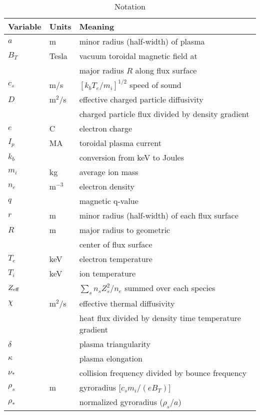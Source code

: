 \begin{table}
\caption{Notation}


\label{table-notation}
\begin{center}
\begin{tabular}{lll}
\hline \hline
Variable \hspace{3pt} & Units \hspace{3pt} & Meaning \\
\hline %
$a$& m & minor radius (half-width) of plasma \\
$B_T$ & Tesla & vacuum toroidal magnetic field at \\ &
   & major radius $R$ along flux surface \\
$c_s$ & m/s & $ [k_b T_e / m_i]^{1/2} $ speed of sound \\
$D$ & m$^2$/s & effective charged particle diffusivity \\
 & & charged particle flux divided by density gradient \\
$e$ & C & electron charge \\
$I_p$ & MA & toroidal plasma current \\
$k_b$ &  & conversion from keV to Joules \\
$m_i$ & kg  & average ion mass \\
$n_e$ & m$^{-3}$ & electron density \\
$q$  & & magnetic q-value \\
$r$& m & minor radius (half-width) of each flux surface \\
$R$ & m & major radius to geometric \\
 & & center of flux surface \\
$T_e$ & keV & electron temperature \\
$T_i$ & keV & ion temperature \\
$Z_{\rm eff}$ & & $\sum_s n_s Z_s^2 / n_e $ summed over each species \\
$\chi$  & m$^2$/s & effective thermal diffusivity \\
 & & heat flux divided by density time temperature gradient \\
$\delta$ &  & plasma triangularity \\
$\kappa$ &  & plasma elongation \\
$\nu_{*}$ & & collision frequency divided by bounce frequency \\
$\rho_s$ & m &  gyroradius [$ c_s m_i / ( e B_T ) $] \\
$\rho_*$ & & normalized gyroradius ($ \rho_s / a $) \\
\hline \hline
\end{tabular}
\end{center}
\end{table}

